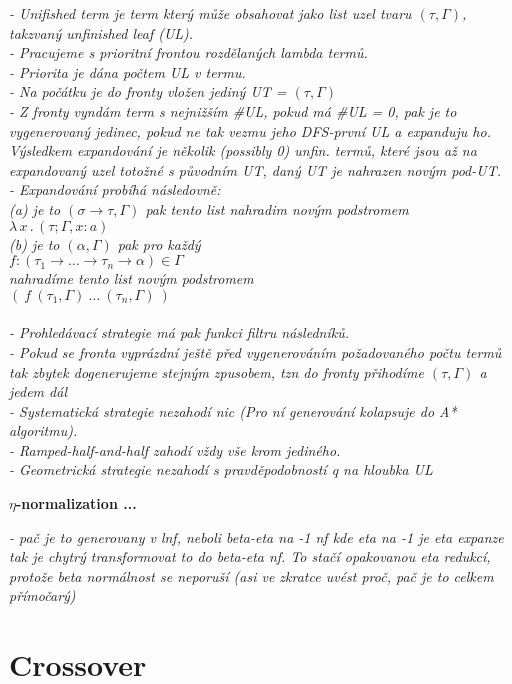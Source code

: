 \documentclass[conference]{IEEEtran}
\newcommand{\lam}[2]{\lambda \, #1 \, . \, #2}
\newcommand{\ar}{\rightarrow\xspace}
\begin{document}
\textit{
- Unifished term je term který může obsahovat jako list uzel tvaru 
$(\tau,\Gamma)$, takzvaný unfinished leaf (UL).\\
- Pracujeme s prioritní frontou rozdělaných lambda termů.\\ 
- Priorita je dána počtem UL v termu.\\
- Na počátku je do fronty vložen jediný UT = $(\tau,\Gamma)$\\
- Z fronty vyndám term s nejnižším \#UL, pokud má \#UL = 0, pak je to vygenerovaný jedinec, pokud ne tak vezmu jeho DFS-první UL a expanduju ho. Výsledkem expandování je několik (possibly 0) unfin. termů, které jsou až na expandovaný uzel totožné s původním UT, daný UT je nahrazen novým pod-UT. \\
- Expandování probíhá následovně: \\
(a) je to  $(\sigma \ar \tau,\Gamma)$ pak tento list nahradim novým podstromem $\lam{x}{(\tau;\Gamma,x:a)}$\\
(b) je to $(\alpha,\Gamma)$ pak pro každý\\ 
$f : (\tau_1 \ar \dots \ar \tau_n \ar \alpha) \in \Gamma$ \\
nahradíme tento list novým podstromem \\
$(~f~(\tau_1,\Gamma)~\dots~(\tau_n,\Gamma)~)$
\\\\
- Prohledávací strategie má pak funkci filtru následníků. \\
- Pokud se fronta vyprázdní ještě před vygenerováním požadovaného 
  počtu termů tak zbytek dogenerujeme stejným zpusobem, tzn do 
  fronty přihodíme $(\tau,\Gamma)$ a jedem dál \\
- Systematická strategie nezahodí nic (Pro ní generování 
  kolapsuje do A* algoritmu).\\
- Ramped-half-and-half zahodí vždy vše krom jediného.\\
- Geometrická strategie nezahodí s pravděpodobností q na hloubka UL \\
}

\textbf{$\eta$-normalization ...}

\textit{- pač je to generovany v lnf, neboli beta-eta na -1 nf kde 
eta na -1 je eta expanze tak je chytrý transformovat 
to do beta-eta nf. To stačí opakovanou eta redukcí, protože beta normálnost
se neporuší (asi ve zkratce uvést proč, pač je to celkem přímočarý) 
}

\section{Crossover}
\end{document}
